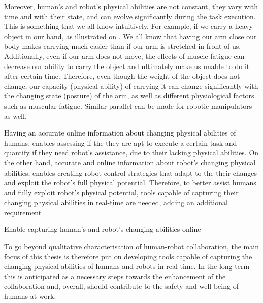 Moreover, human's and robot's physical abilities are not constant, they vary with time and with their state, and can evolve significantly during the task execution.
This is something that we all know intuitively. For example, if we carry a heavy object in our hand, as illustrated on . We all know that having our arm close our body makes carrying much easier than if our arm is stretched in front of us. Additionally, even if our arm does not move, the effects of muscle fatigue can decrease our ability to carry the object and ultimately make us unable to do it after certain time.
Therefore, even though the weight of the object does not change, our capacity (physical ability) of carrying it can change significantly with the changing state (posture) of the arm, as well as different physiological factors such as muscular fatigue.
Similar parallel can be made for robotic manipulators as well. 


Having an accurate online information about changing physical abilities of humans, enables assessing if the they are apt to execute a certain task and quantify if they need robot's assistance, due to their lacking physical abilities. On the other hand, accurate and online information about robot's changing physical abilities, enables creating robot control strategies that adapt to the their changes and exploit the robot's full physical potential. Therefore, to better assist humans and fully exploit robot's physical potential, tools capable of capturing their changing physical abilities in real-time are needed, adding an additional requirement
\begin{requirement} \label{req:online}
     Enable capturing human's and robot's changing abilities online
\end{requirement}

To go beyond qualitative characterisation of human-robot collaboration, the main focus of this thesis is therefore put on developing tools capable of capturing the changing physical abilities of humans and robots in real-time. In the long term this is anticipated as a necessary steps towards the enhancement of the collaboration and, overall, should contribute to the safety and well-being of humans at work.

